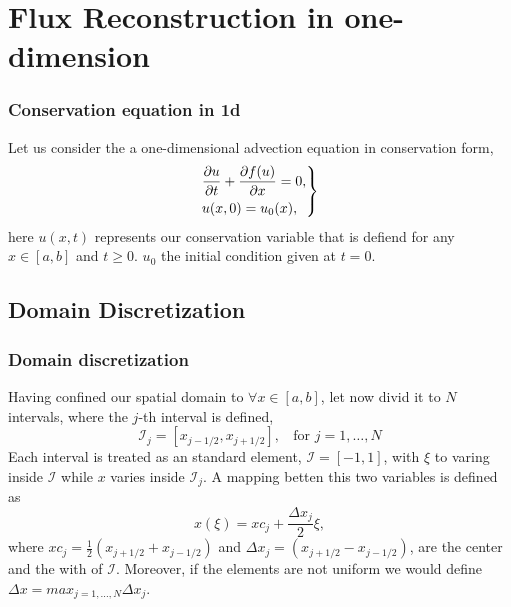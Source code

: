\section{Flux Reconstruction in one-dimension}


\begin{frame} \frametitle{Conservation equation in 1d}
	Let us consider the a one-dimensional advection equation in conservation form,
	\begin{equation}
	\left.\begin{aligned}
		&\frac{\partial u}{\partial t}+\frac{\partial f(u)}{\partial x}=0,\\
		&u(x,0) = u_0(x),
		\end{aligned}
	\right\}
	\label{eq:conservation_law_1d} 
	\end{equation}
	here $u(x,t)$ represents our conservation variable that is defiend for any $x \in [a,b]$ and $t\geqslant 0$. $u_0$ the initial condition given at $t=0$.  
\end{frame}

\subsection{Domain Discretization}

\begin{frame} \frametitle{Domain discretization}
	Having confined our spatial domain to $\forall x \in [a,b]$, let now divid it to $N$ intervals, where the $j$-th interval is defined,
	\begin{equation}
	\mathcal{I}_j = [x_{j-1/2},x_{j+1/2}], \;\;\text{ for } j = 1,\dots,N
	\end{equation}
	Each interval is treated as an standard element, $\mathcal{I} = [-1,1]$, with $\xi$ to varing inside $\mathcal{I}$ while $x$ varies inside $\mathcal{I}_j$. A mapping betten this two variables is defined as
	\begin{equation}
	x(\xi) = xc_j + \frac{\Delta x_j}{2} \xi,
	\label{eq:local2global_mapping}
	\end{equation}
	where $xc_j = \frac{1}{2}(x_{j+1/2}+x_{j-1/2})$ and $\Delta x_j = (x_{j+1/2}-x_{j-1/2})$, are the center and the with of $\mathcal{I}$. Moreover, if the elements are not uniform we would define $\Delta x = max_{j=1,\dots,N} \Delta x_j$. 
\end{frame}

